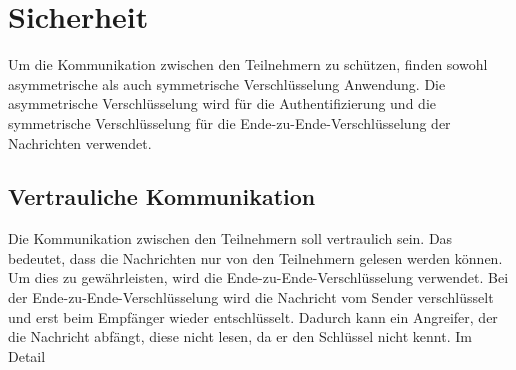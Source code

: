 \section{Sicherheit}
\label{subsec:sicherheit}

Um die Kommunikation zwischen den Teilnehmern zu schützen, finden sowohl asymmetrische als auch symmetrische Verschlüsselung Anwendung. Die asymmetrische Verschlüsselung wird für die Authentifizierung und die symmetrische Verschlüsselung für die Ende-zu-Ende-Verschlüsselung der Nachrichten verwendet. 

\subsection{Vertrauliche Kommunikation}
\label{subsec:vertrauliche_kommunikation}

Die Kommunikation zwischen den Teilnehmern soll vertraulich sein. Das bedeutet, dass die Nachrichten nur von den Teilnehmern gelesen werden können. Um dies zu gewährleisten, wird die Ende-zu-Ende-Verschlüsselung verwendet. Bei der Ende-zu-Ende-Verschlüsselung wird die Nachricht vom Sender verschlüsselt und erst beim Empfänger wieder entschlüsselt. Dadurch kann ein Angreifer, der die Nachricht abfängt, diese nicht lesen, da er den Schlüssel nicht kennt. Im Detail 